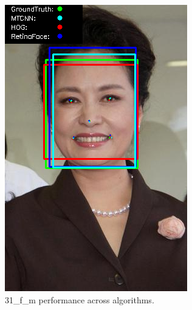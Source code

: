 \documentclass{l4proj}
\begin{document}
\begin{appendices}
\begin{figure}[h!]
\begin{minipage}{0.49\textwidth}
     \includegraphics[width=\textwidth]{images/appendix/31.png}
    \caption{31\_f\_m performance across algorithms.}
    \label{whoopi_result}
  \end{minipage}
\end{figure}


\end{appendices}
\end{document}
